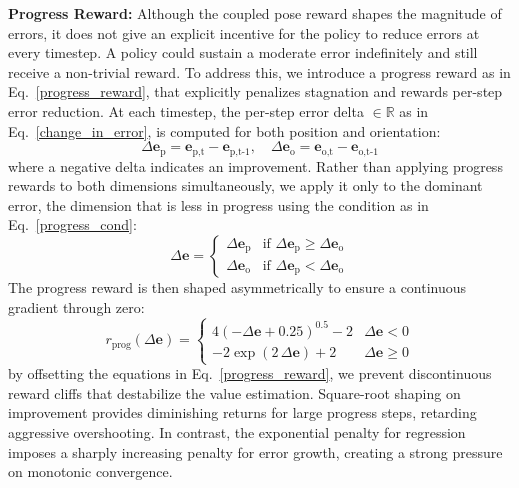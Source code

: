\documentclass[preprint,12pt]{elsarticle}
\begin{document}
\noindent \textbf{Progress Reward:}
 Although the coupled pose reward shapes the magnitude of errors, it does not give an explicit incentive for the policy to reduce errors at every timestep. A policy could sustain a moderate error indefinitely and still receive a non-trivial reward. To address this, we introduce a progress reward as in Eq.~\eqref{progress_reward}, that explicitly penalizes stagnation and rewards per-step error reduction.
 At each timestep, the per-step error delta $\in\mathbb{R}$ as in Eq.~\eqref{change_in_error}, is computed for both position and orientation:
 \begin{equation}
    \Delta{\mathbf{\text{e}}}_\text{p} = {\mathbf{\text{e}}}_\text{p,t} - {\mathbf{\text{e}}}_\text{p,t-1}, \quad \Delta{\mathbf{\text{e}}}_\text{o} = {\mathbf{\text{e}}}_\text{o,t} - {\mathbf{\text{e}}}_\text{o,t-1}
    \label{change_in_error}
\end{equation}
where a negative delta indicates an improvement. Rather than applying progress rewards to both dimensions simultaneously, we apply it only to the dominant error, the dimension that is less in progress using the condition as in Eq.~\eqref{progress_cond}:
\begin{equation}
    \Delta{\mathbf{\text{e}}} = \begin{cases} \Delta{\mathbf{\text{e}}}_\text{p} & \text{if } \Delta{\mathbf{\text{e}}}_\text{p} \geq \Delta{\mathbf{\text{e}}}_\text{o}\\ 
    \Delta{\mathbf{\text{e}}}_\text{o} & \text{if } \Delta{\mathbf{\text{e}}}_\text{p} < \Delta{\mathbf{\text{e}}}_\text{o}
    \end{cases}
    \label{progress_cond}
\end{equation}
The progress reward is then shaped asymmetrically to ensure a continuous gradient through zero:
\begin{equation}
    r_\text{prog}(\Delta{\mathbf{\text{e}}}) = \begin{cases} 4(-\Delta{\mathbf{\text{e}}} + 0.25)^{0.5} - 2 & \Delta{\mathbf{\text{e}}} < 0 
    \\ -2\exp(2\,\Delta{\mathbf{\text{e}}}) + 2 & \Delta{\mathbf{\text{e}}} \geq 0
    \end{cases}
    \label{progress_reward}
\end{equation}
\noindent by offsetting the equations in Eq.~\eqref{progress_reward}, we prevent discontinuous reward cliffs that destabilize the value estimation. Square-root shaping on improvement provides diminishing returns for large progress steps, retarding aggressive overshooting. In contrast, the exponential penalty for regression imposes a sharply increasing penalty for error growth, creating a strong pressure on monotonic convergence.
\end{document}
